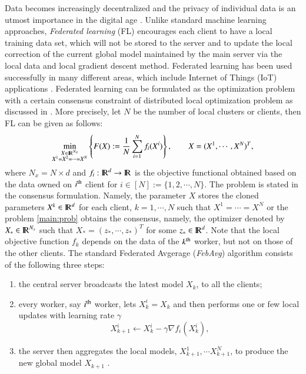 \documentclass{article}
\newcommand{\Reals}[1]{{\rm I\! R}^{#1}}
\theoremstyle{definition}
\begin{document}
Data becomes increasingly decentralized and the privacy of individual data is an utmost importance in the digital age \cite{house2012consumer, cai2021deepstroke,chen2020ai,luo2020arbee,wang2020panel}. Unlike standard machine learning approaches, \textit{Federated learning} (FL) encourages each client to have a local training data set, which will not be stored to the server and  to update the local correction of the current global model maintained by the main server via the local data and local gradient descent method. Federated learning has been used successfully in many different areas, which include Internet of Things (IoT) applications \cite{hwang2015iot, ferrag2021federated}. Federated learning can be formulated as the optimization problem with a certain consensus constraint of distributed local optimization problem as discussed in \cite{mishchenko2022proxskip}. More precisely, let $N$ be the number of local clusters or clients, then FL can be given as follows:  
\begin{equation}\label{main:prob} 
\min_{ \substack{ X \in \Reals{N_x} \\X^1 = X^2 =\cdots = X^{N} } } \left \{ F(X) := \frac{1}{N} \sum_{i=1}^{N} f_i(X^i) \right \}, \qquad  X = (X^1,\cdots,X^{N})^T, 
\end{equation}
where $N_x = N \times d$ and $f_i : \Reals{d} \rightarrow \Reals{}$ is the objective functional obtained based on the data owned on $i^{\rm th}$ client for 
$i \in [N] := \{1,2,\cdots,N\}$. The problem is stated in the consensus formulation. Namely, the parameter $X$ stores the cloned parameters $X^k \in \Reals{d}$ for each client, $k=1,\cdots,N$ such that $X^1 = \cdots = X^N$ or the problem \eqref{main:prob} obtains the consensus, namely, the optimizer denoted by $X_* \in \Reals{N_x}$ such that $X_* = (z_*,\cdots,z_*)^T$ for some $z_* \in \Reals{d}$. Note that the local objective function $f_k$ depends on the data of the $k^{\rm th}$ worker, but not on those of the other clients. The standard Federated Avgerage ({\textit{FebAvg}}) algorithm consists of the following three steps: 
\begin{enumerate}
\item  the central server broadcasts the latest model $X_k$, to all the clients;
\item every worker, say $i^{\rm th}$ worker, lets $X_k^i = X_k$ and then performs one or few local updates with learning rate $\gamma$ 
\begin{equation}\label{gdstep2} 
X_{k+1}^i \leftarrow X_k^i - \gamma \nabla f_i(X_k^i),   
\end{equation}
\item the server then aggregates the local models, $X_{k+1}^1, \cdots X_{k+1}^{N}$, to produce the new global model $X_{k+1}$ \cite{konevcny2016federated}.
\end{enumerate}
\end{document}
